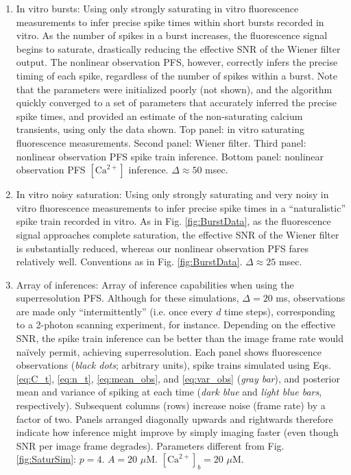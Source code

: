 \documentclass[10pt]{article}
\newcommand{\Ca}{[\text{Ca}^{2+}]}
\begin{document}
\begin{enumerate}
\item In vitro bursts: Using only strongly saturating in vitro fluorescence measurements to infer precise spike times within short bursts recorded in vitro. As the number of spikes in a burst increases, the fluorescence signal begins to saturate, drastically reducing the effective SNR of the Wiener filter output. The nonlinear observation PFS, however, correctly infers the precise timing of each spike, regardless of the number of spikes within a burst. Note that the parameters were initialized poorly (not shown), and the algorithm quickly converged to a set of parameters that accurately inferred the precise spike times, and provided an estimate of the non-saturating calcium transients, using only the data shown. Top panel: in vitro saturating fluorescence measurements. Second panel: Wiener filter.  Third panel: nonlinear observation PFS spike train inference.  Bottom panel: nonlinear observation PFS $\Ca$ inference. $\Delta \approx 50$ msec. 
\item In vitro noisy saturation: Using only strongly saturating and very noisy in vitro fluorescence measurements to infer precise spike times in a ``naturalistic'' spike train recorded in vitro.  As in Fig. \ref{fig:BurstData}, as the fluorescence signal approaches complete saturation, the effective SNR of the Wiener filter is substantially reduced, whereas our nonlinear observation PFS fares relatively well.  Conventions as in Fig. \ref{fig:BurstData}. $\Delta \approx 25$ msec.
\item Array of inferences: Array of inference capabilities when using the superresolution PFS.  Although for these simulations, $\Delta=20$ ms, observations are made only ``intermittently'' (i.e. once every $d$ time steps), corresponding to a 2-photon scanning experiment, for instance. Depending on the effective SNR, the spike train inference can be better than the image frame rate would na\"{i}vely permit, achieving superresolution.  Each panel shows fluorescence observations (\emph{black dots}; arbitrary units), spike trains simulated using Eqs. \ref{eq:C_t}, \ref{eq:n_t}, \ref{eq:mean_obs}, and \ref{eq:var_obs} (\emph{gray bar}), and posterior mean and variance of spiking at each time (\emph{dark blue} and \emph{light blue bars}, respectively). Subsequent columns (rows) increase noise (frame rate) by a factor of two. Panels arranged diagonally upwards and rightwards therefore indicate how inference might improve by simply imaging faster (even though SNR per image frame degrades). Parameters different from Fig. \ref{fig:SaturSim}: $p=4$. $A=20$ $\mu$M. $\Ca_b=20$ $\mu$M.  

\end{enumerate}
\end{document}
